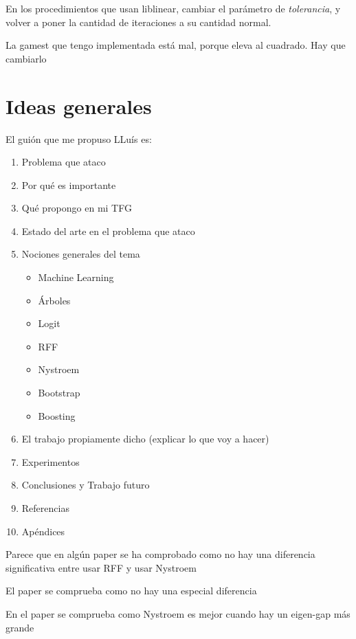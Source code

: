 
\begin{note}

  En los procedimientos que usan liblinear, cambiar el parámetro de
  \textit{tolerancia}, y volver a poner la cantidad de iteraciones a
  su cantidad normal.

  La gamest que tengo implementada está mal, porque eleva al cuadrado. Hay
  que cambiarlo



  \section*{Ideas generales}

  El guión que me propuso LLuís es:
  \begin{enumerate}
   \item Problema que ataco
   \item Por qué es importante
   \item Qué propongo en mi TFG
   \item Estado del arte en el problema que ataco
   \item Nociones generales del tema
         \begin{itemize}
          \item Machine Learning
          \item Árboles
          \item Logit
          \item RFF
          \item Nystroem
          \item Bootstrap
          \item Boosting
         \end{itemize}
   \item El trabajo propiamente dicho (explicar lo que voy a hacer)
   \item Experimentos
   \item Conclusiones y Trabajo futuro
   \item Referencias
   \item Apéndices
  \end{enumerate}


  Parece que en algún paper se ha comprobado como no hay una diferencia
  significativa entre usar RFF y usar Nystroem

  El paper \cite{rff_equals_nys} se comprueba como no hay una especial diferencia

  En el paper \cite{nys_better_rff} se comprueba como Nystroem es mejor cuando
  hay un eigen-gap más grande

\end{note}
